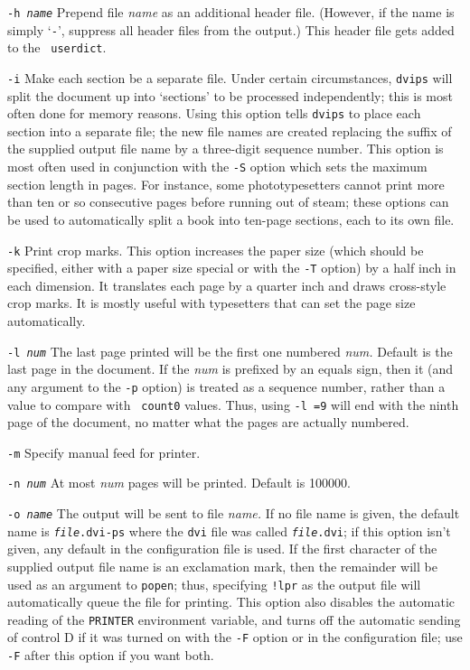 \begin{list}
\item [\tt -h \em name]
Prepend file {\it name}
as an additional header file. (However, if the name is simply `{\tt -}',
suppress all header files from the output.)  This header file
gets added to the \PS\ {\tt userdict}.

\item [\tt -i] Make each section be a separate file.  Under certain circumstances,
{\tt dvips} will split the document up into `sections' to be processed
independently; this is most often done for memory reasons.  Using this
option tells {\tt dvips} to place each section into a separate file; the
new file names are created replacing the suffix of the supplied output
file name by a three-digit sequence number.
This option is most often used in
conjunction with the {\tt -S} option which sets the maximum section length
in pages.  For instance, some phototypesetters cannot print more than
ten or so consecutive pages before running out of steam; these options
can be used to automatically split a book into ten-page sections, each
to its own file.

\item [\tt -k]  Print crop marks.  This option increases the paper size
(which should be specified, either with a paper size special or
with the {\tt -T} option) by a half inch in each dimension.  It
translates each page by a quarter inch and draws cross-style
crop marks.  It is mostly useful with typesetters that can set
the page size automatically.

\item [\tt -l \em num]
The last page printed will be the first one numbered {\it num.}
Default is the last page in the document.  If the {\it num} is
prefixed by an equals sign, then it (and any argument to the
{\tt -p} option) is treated as a sequence number, rather than
a value to compare with {\tt {} count0} values.  Thus,
using {\tt -l =9} will end with the ninth page of the document,
no matter what the pages are actually numbered.

\item [\tt -m]  Specify manual feed for printer.

\item [\tt -n \em num]
At most {\it num} pages will be printed. Default is 100000.

\item [\tt -o \em name]  The output will be sent to file {\it name.}
If no file name is given, the default name is {\tt {\it file}.dvi-ps} where
the {\tt dvi} file was called {\tt {\it file}.dvi};
if this option isn't given, any default in the configuration file is used.
If the first character of the supplied output file name is an
exclamation mark, then
the remainder will be used as an argument to {\tt popen}; thus, specifying
{\tt !lpr} as the output file will automatically queue the file for printing.
This option also disables the automatic reading of the {\tt PRINTER}
environment variable, and turns off the automatic sending of control D
if it was turned on with the {\tt -F} option or in the configuration file;
use {\tt -F} after this option if you want both.


\end{list}
